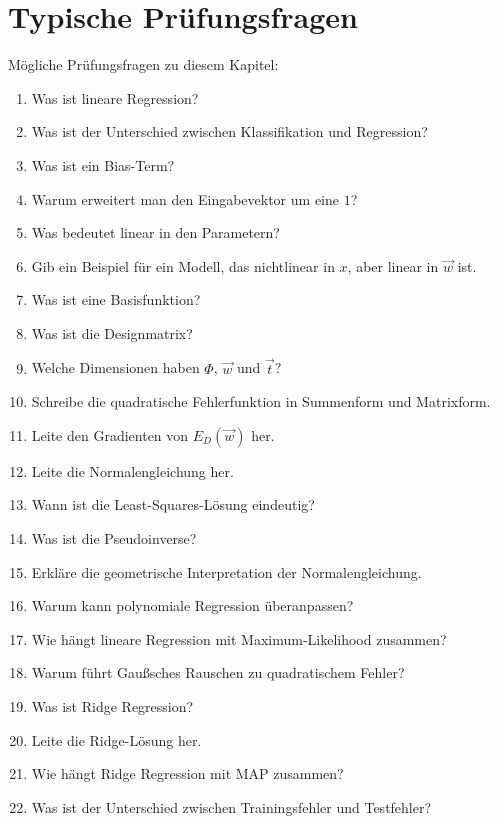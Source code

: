 \section{Typische Prüfungsfragen}

\begin{examtipbox}
Mögliche Prüfungsfragen zu diesem Kapitel:

\begin{enumerate}
    \item Was ist lineare Regression?
    \item Was ist der Unterschied zwischen Klassifikation und Regression?
    \item Was ist ein Bias-Term?
    \item Warum erweitert man den Eingabevektor um eine \(1\)?
    \item Was bedeutet linear in den Parametern?
    \item Gib ein Beispiel für ein Modell, das nichtlinear in \(x\), aber linear in \(\vec{w}\) ist.
    \item Was ist eine Basisfunktion?
    \item Was ist die Designmatrix?
    \item Welche Dimensionen haben \(\Phi\), \(\vec{w}\) und \(\vec{t}\)?
    \item Schreibe die quadratische Fehlerfunktion in Summenform und Matrixform.
    \item Leite den Gradienten von \(E_D(\vec{w})\) her.
    \item Leite die Normalengleichung her.
    \item Wann ist die Least-Squares-Lösung eindeutig?
    \item Was ist die Pseudoinverse?
    \item Erkläre die geometrische Interpretation der Normalengleichung.
    \item Warum kann polynomiale Regression überanpassen?
    \item Wie hängt lineare Regression mit Maximum-Likelihood zusammen?
    \item Warum führt Gaußsches Rauschen zu quadratischem Fehler?
    \item Was ist Ridge Regression?
    \item Leite die Ridge-Lösung her.
    \item Wie hängt Ridge Regression mit MAP zusammen?
    \item Was ist der Unterschied zwischen Trainingsfehler und Testfehler?
\end{enumerate}
\end{examtipbox}